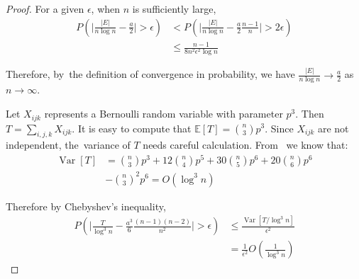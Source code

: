 \documentclass[entropy,article,accept,moreauthors,pdftex]{Definitions/mdpi}
\newcommand{\1}{\mathbbm{1}}
\DeclareMathOperator{\Var}{Var}
\begin{document}
\begin{paracol}{2}
\begin{proof}
	For a given $\epsilon$, when $n$ is sufficiently large,
	\begin{align*}
	P(\Big|\frac{|E|}{n \log n } - \frac{a}{2} \Big| > \epsilon) & <
	P(\Big|\frac{|E|}{n \log n } - \frac{a}{2} \frac{n-1}{n}\Big| > 2\epsilon) \\
	& \leq \frac{n-1}{8n^2 \epsilon^2 \log n}
	\end{align*}
	
	Therefore, by~the definition of convergence in probability, we have $\frac{|E|}{n \log n} \to \frac{a}{2}$ as $n\to \infty$.
	
	Let $X_{ijk}$ represents a Bernoulli random variable with parameter $p^3$.
	Then $T = \sum_{i,j,k} X_{ijk}$.
	It is easy to compute that $\mathbb{E}[T] = \binom{n}{3}p^3$. Since $X_{ijk}$ are not independent, the~variance of $T$ needs careful calculation.
	From~\cite{holland1977method} we know that:
	\begin{align*}
	\Var[T] & = \binom{n}{3} p^3 + 12 \binom{n}{4} p^5 + 30 \binom{n}{5} p^6 + 20 \binom{n}{6} p^6\\
	 &- \binom{n}{3}^2 p^6   = O(\log^3 n)
	\end{align*}
	
	Therefore
	by Chebyshev's inequality,
	\begin{align*}
	P(\Big|\frac{T}{\log^3 n } - \frac{a^3}{6} \frac{(n-1)(n-2)}{n^2}\Big| > \epsilon) &\leq \frac{\Var[T /\log^3 n ]}{\epsilon^2} \\ 
	& = \frac{1}{\epsilon^2}O(\frac{1}{\log^3 n})
	\end{align*}
	

\end{proof}
\end{paracol}
\end{document}
